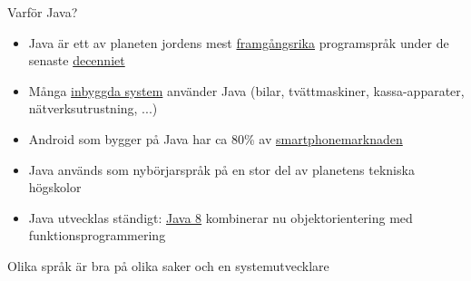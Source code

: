 \documentclass{lecturenotes}
\begin{document}
\begin{Slide}{Varför Java?}
\begin{itemize}
\item Java är ett av planeten jordens mest \href{http://www.tiobe.com/index.php/content/paperinfo/tpci/index.html}{framgångsrika} programspråk under de senaste \href{http://computersweden.idg.se/2.2683/1.627748/grattis-java-kungen-bland-sprak-fyller-20-ar-i-dag}{decenniet}
\item Många \href{https://docs.oracle.com/javase/8/embedded/develop-apps-platforms/overview.htm}{inbyggda system} använder Java (bilar, tvättmaskiner, kassa-apparater, nätverksutrustning, ...) 
\item Android som bygger på Java har ca 80\% av 
\href{http://www.businessinsider.com/iphone-v-android-market-share-2014-5?IR=T}{smartphonemarknaden}
\item Java används som nybörjarspråk på en stor del av planetens tekniska högskolor
\item Java utvecklas ständigt: \href{http://computersweden.idg.se/2.2683/1.546580/magisk-syntax-lyfter-java}{Java 8} kombinerar nu objektorientering med funktionsprogrammering
\end{itemize}
Olika språk är bra på olika saker och en systemutvecklare 
\end{Slide}

\end{document}

